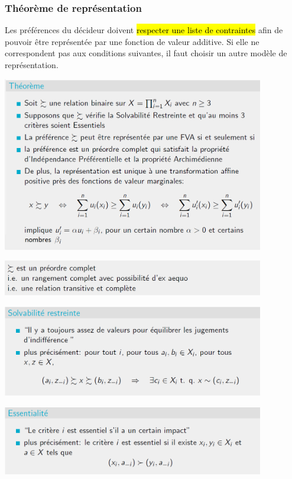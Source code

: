 \documentclass[a4paper, 12pt]{article}
\newcommand{\alinea}{
\hspace*{0.5cm}}
\begin{document}
		\subsubsection{Théorème de représentation}
			\alinea Les préférences du décideur doivent \hl{respecter une liste de contraintes} afin de pouvoir être représentée par une 
				fonction de valeur additive. Si elle ne correspondent pas aux conditions suivantes, il faut choisir un autre modèle de 
				représentation.
			\begin{center}
				\includegraphics[width=4.5in]{Images/FVA}
			\end{center}
			\begin{center}
				\includegraphics[width=4.5in]{Images/preordre}
			\end{center}
			\begin{center}
				\includegraphics[width=4.5in]{Images/solvabilite_restreinte}
			\end{center}
			\begin{center}
				\includegraphics[width=4.5in]{Images/essentiel}
			\end{center}
\end{document}
